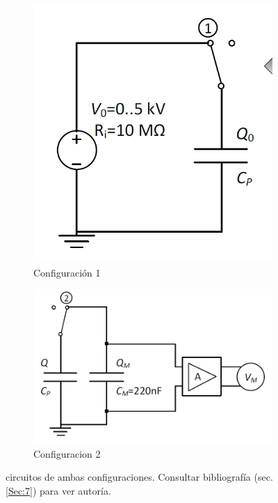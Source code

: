 \documentclass[12pt,a4paper]{article}
\begin{document}
\begin{figure} \centering
\begin{subfigure}[b]{0.35\linewidth}
\includegraphics[width=\linewidth]{configuracion1.png}
\caption{Configuración 1}
\label{Fig:cofiguracion1}
\end{subfigure}
\begin{subfigure}[b]{0.558\linewidth}
\includegraphics[width=\linewidth]{configuracion2.png}
\caption{Configuracion 2}
\label{Fig:configuracion2}
\end{subfigure}
\caption{circuitos de ambas configuraciones. Consultar bibliografía (sec. \ref{Sec:7}) para ver autoría.}
\end{figure}
\end{document}
